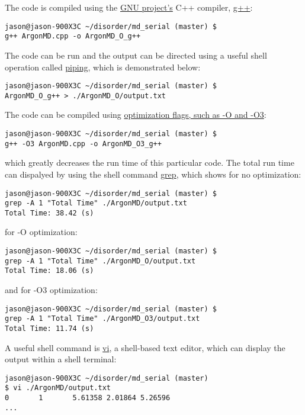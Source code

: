 The code is compiled using the 
\href{http://www.gnu.org/}{GNU project's} 
C++ compiler, \href{http://www.cprogramming.com/g++.html}{g++}:
\begin{lstlisting}
jason@jason-900X3C ~/disorder/md_serial (master) $ 
g++ ArgonMD.cpp -o ArgonMD_O_g++
\end{lstlisting}
The code can be run and the output can be directed using a useful 
shell operation called 
\href{http://www.linfo.org/pipes.html}{piping}, 
which is demonstrated below:
\begin{lstlisting}
jason@jason-900X3C ~/disorder/md_serial (master) $ 
ArgonMD_O_g++ > ./ArgonMD_O/output.txt
\end{lstlisting}
The code can be compiled using 
\href{http://gcc.gnu.org/onlinedocs/gcc/Optimize-Options.html#Optimize-Options}
{optimization flags, such as -O and -O3}:
\begin{lstlisting}
jason@jason-900X3C ~/disorder/md_serial (master) $ 
g++ -O3 ArgonMD.cpp -o ArgonMD_O3_g++
\end{lstlisting}
which greatly decreases the run time of this particular code. 
The total run time 
can dispalyed by using the shell command 
\href{http://linux.about.com/od/commands/l/blcmdl1_grep.htm}{grep},  
which shows for no optimization:
\begin{lstlisting}
jason@jason-900X3C ~/disorder/md_serial (master) $ 
grep -A 1 "Total Time" ./ArgonMD/output.txt
Total Time: 38.42 (s)
\end{lstlisting}
for -O optimization:
\begin{lstlisting}
jason@jason-900X3C ~/disorder/md_serial (master) $ 
grep -A 1 "Total Time" ./ArgonMD_O/output.txt
Total Time: 18.06 (s)
\end{lstlisting}
and for -O3 optimization:
\begin{lstlisting}
jason@jason-900X3C ~/disorder/md_serial (master) $ 
grep -A 1 "Total Time" ./ArgonMD_O3/output.txt
Total Time: 11.74 (s)
\end{lstlisting}
A useful shell command is 
\href{http://www.tuxfiles.org/linuxhelp/vimcheat.html}{vi}, a 
shell-based text editor, which can display the output within 
a shell terminal:
\begin{lstlisting}
jason@jason-900X3C ~/disorder/md_serial (master) 
$ vi ./ArgonMD/output.txt
0       1       5.61358 2.01864 5.26596
...
\end{lstlisting}

